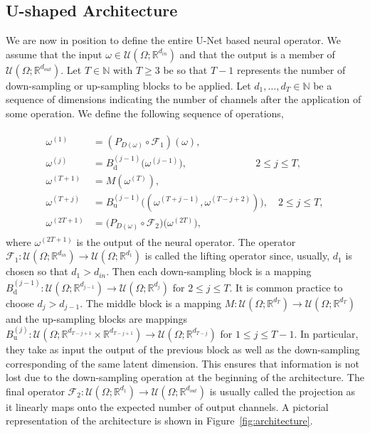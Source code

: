 \documentclass[preprint,11pt]{elsarticle}
\theoremstyle{plain}
\newcommand{\R}{\mathbb{R}}
\begin{document}
\subsection{U-shaped Architecture}
\label{u-shaped}

We are now in position to define the entire U-Net based neural operator. We assume that the input $\omega \in \mathcal{U}(\Omega; \R^{d_{in}})$ and that the output is a member of $\mathcal{U}(\Omega;\R^{d_{out}})$. Let $T \in \mathbb{N}$ with $T \geq 3$ be so that $T-1$ represents the number of down-sampling or up-sampling blocks to be applied. Let $d_1,\dots,d_T \in \mathbb{N}$ be a sequence of dimensions indicating the number of channels after the application of some operation. We define the following sequence of operations,

\begin{align}
    \label{eq:local_no}
    \begin{split}
    \omega^{(1)} &= (P_{D(\omega)} \circ \mathcal{F}_1) (\omega), \\
    \omega^{(j)} &= B_{\text{d}}^{(j-1)} \big ( \omega^{(j-1)} \big ), \qquad \qquad \qquad\:\:\:\: 2 \leq j \leq T, \\
    \omega^{(T+1)} &= M(\omega^{(T)}), \\
    \omega^{(T+j)} &= B_{\text{u}}^{(j-1)} \big ( (\omega^{(T+j-1)}, \omega^{(T-j+2)}) \big ), \quad 2 \leq j \leq T, \\
    \omega^{(2T+1)} &= \big( P_{D(\omega)} \circ \mathcal{F}_2 \big ) \big ( \omega^{(2T)} \big ),
    \end{split}
\end{align}
where $\omega^{(2T+1)}$ is the output of the neural operator. The operator $\mathcal{F}_1 : \mathcal{U}(\Omega;\R^{d_{in}}) \to \mathcal{U}(\Omega;\R^{d_{1}})$ is called the lifting operator since, usually, $d_1$ is chosen so that $d_1 > d_{in}$. Then each down-sampling block is a mapping $B_{\text{d}}^{(j-1)} : \mathcal{U}(\Omega;\R^{d_{j-1}}) \to \mathcal{U}(\Omega;\R^{d_{j}})$ for $2 \leq j \leq T$. It is common practice to choose $d_j > d_{j-1}$. The middle block is a mapping $M : \mathcal{U}(\Omega;\R^{d_{T}}) \to \mathcal{U}(\Omega;\R^{d_{T}})$ and the up-sampling blocks are mappings $B_{\text{u}}^{(j)}: \mathcal{U}(\Omega;\R^{d_{T-j+1}} \times \R^{d_{T - j + 1}}) \to \mathcal{U}(\Omega;\R^{d_{T-j}})$ for $1 \leq j \leq T-1$. In particular, they take as input the output of the previous block as well as the down-sampling corresponding of the same latent dimension. This ensures that information is not lost due to the down-sampling operation at the beginning of the architecture. The final operator $\mathcal{F}_2 : \mathcal{U}(\Omega;\R^{d_{1}}) \to \mathcal{U}(\Omega;\R^{d_{out}})$ is usually called the projection as it linearly maps onto the expected number of output channels. A pictorial representation of the architecture is shown in Figure~\ref{fig:architecture}.
\end{document}
